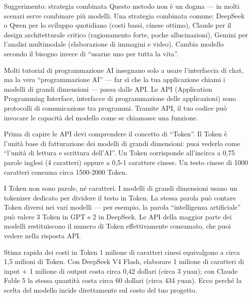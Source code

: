 \begin{tcbinfo}{Suggerimento: strategia combinata}
Questo metodo non è un dogma — in molti scenari serve combinare più modelli. Una strategia combinata comune: DeepSeek o Qwen per lo sviluppo quotidiano (costi bassi, cinese ottimo), Claude per il design architetturale critico (ragionamento forte, poche allucinazioni), Gemini per l'analisi multimodale (elaborazione di immagini e video). Cambia modello secondo il bisogno invece di “usarne uno per tutta la vita”.

\end{tcbinfo}


Molti tutorial di programmazione AI insegnano solo a usare l'interfaccia di chat, ma la vera “programmazione AI” — far sì che la tua applicazione chiami i modelli di grandi dimensioni — passa dalle API. Le API (Application Programming Interface, interfacce di programmazione delle applicazioni) sono protocolli di comunicazione tra programmi. Tramite API, il tuo codice può invocare le capacità del modello come se chiamasse una funzione.


Prima di capire le API devi comprendere il concetto di “Token”. Il Token è l'unità base di fatturazione dei modelli di grandi dimensioni: puoi vederlo come “l'unità di lettura e scrittura dell'AI”. Un Token corrisponde all'incirca a 0,75 parole inglesi (4 caratteri) oppure a 0,5-1 carattere cinese. Un testo cinese di 1000 caratteri consuma circa 1500-2000 Token.

I Token non sono parole, né caratteri. I modelli di grandi dimensioni usano un tokenizer dedicato per dividere il testo in Token. La stessa parola può contare Token diversi nei vari modelli — per esempio, la parola “intelligenza artificiale” può valere 3 Token in GPT e 2 in DeepSeek. Le API della maggior parte dei modelli restituiscono il numero di Token effettivamente consumato, che puoi vedere nella risposta API.

\begin{tcbinfo}{Stima rapida dei costi in Token}
1 milione di caratteri cinesi equivalgono a circa 1,5 milioni di Token. Con DeepSeek V4 Flash, elaborare 1 milione di caratteri di input + 1 milione di output costa circa 0,42 dollari (circa 3 yuan); con Claude Fable 5 la stessa quantità costa circa 60 dollari (circa 434 yuan). Ecco perché la scelta del modello incide direttamente sul costo del tuo progetto.

\end{tcbinfo}

